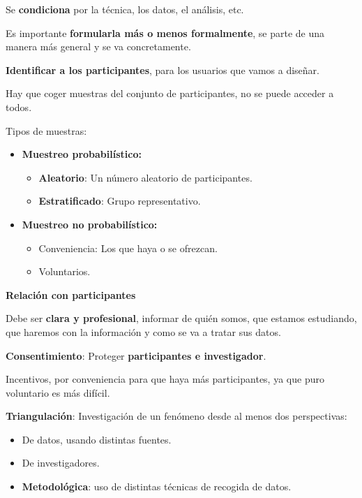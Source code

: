 \documentclass[12pt]{report} %
\begin{document}
Se \textbf{condiciona} por la técnica, los datos, el análisis, etc.

Es importante \textbf{formularla más o menos formalmente}, se parte de
una manera más general y se va concretamente.

\textbf{Identificar a los participantes}, para los usuarios que vamos a
diseñar.

Hay que coger muestras del conjunto de participantes, no se puede
acceder a todos.

\newpage

Tipos de muestras:

\begin{itemize}

\item
  \textbf{Muestreo probabilístico:}

  \begin{itemize}
  
  \item
    \textbf{Aleatorio}: Un número aleatorio de participantes.

    
    \item
      \textbf{Estratificado}: Grupo representativo.
  \end{itemize}
\item
  \textbf{Muestreo no probabilístico:}

  \begin{itemize}
  
  \item
    Conveniencia: Los que haya o se ofrezcan.

    
    \item
      Voluntarios.
  \end{itemize}
\end{itemize}

\textbf{Relación con participantes}

Debe ser \textbf{clara y profesional}, informar de quién somos, que
estamos estudiando, que haremos con la información y como se va a tratar
sus datos.

\textbf{Consentimiento}: Proteger \textbf{participantes e investigador}.

Incentivos, por conveniencia para que haya más participantes, ya que
puro voluntario es más difícil.

\textbf{Triangulación}: Investigación de un fenómeno desde al menos dos
perspectivas:

\begin{itemize}
\item
  De datos, usando distintas fuentes.
\item
  De investigadores.
\item
  \textbf{Metodológica}: uso de distintas técnicas de recogida de datos.
\end{itemize}
\end{document}
